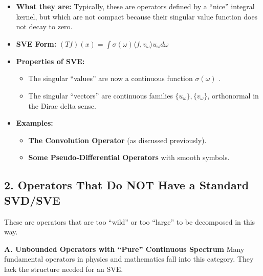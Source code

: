 \documentclass[aps,prl,reprint]{revtex4-2}
\begin{document}
\begin{itemize}
\item \textbf{What they are:} Typically, these are operators defined by a
``nice'' integral kernel, but which are not compact because their singular
value function does not decay to zero.

\item \textbf{SVE Form:} $(Tf)(x) = \int \sigma(\omega) \langle f, v_\omega
\rangle u_\omega d\omega$

\item \textbf{Properties of SVE:} 

\begin{itemize}
\item The singular ``values'' are now a continuous function $\sigma(\omega)$%
. 

\item The singular ``vectors'' are continuous families $\{u_\omega\},
\{v_\omega\}$, orthonormal in the Dirac delta sense. 
\end{itemize}

\item \textbf{Examples:} 

\begin{itemize}
\item \textbf{The Convolution Operator} (as discussed previously). 

\item \textbf{Some Pseudo-Differential Operators} with smooth symbols. 
\end{itemize}
\end{itemize}

\subsection*{2. Operators That Do NOT Have a Standard SVD/SVE}

These are operators that are too ``wild'' or too ``large'' to be decomposed
in this way.

\textbf{A. Unbounded Operators with ``Pure'' Continuous Spectrum} Many
fundamental operators in physics and mathematics fall into this category.
They lack the structure needed for an SVE.
\end{document}
